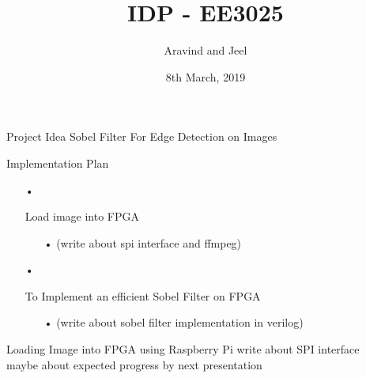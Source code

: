 \documentclass[11pt]{beamer}
\author{Aravind and Jeel}
\title{IDP - EE3025}
\institute{IIT Hyderabad}
\date{8th March, 2019}
\begin{document}
\begin{frame}
\titlepage
\end{frame}

\begin{frame}{Project Idea}
	\textsf{Sobel Filter For Edge Detection on Images}
\end{frame}

\begin{frame}{Implementation Plan}
	\begin{itemize}
		\item[•] {Load image into FPGA
			\begin{itemize}
				\item[•] (write about spi interface and ffmpeg)
			\end{itemize}
		}
		\pause
		\item[•] { To Implement an efficient Sobel Filter on FPGA
			\begin{itemize}
				\item[•] (write about sobel filter implementation in verilog)
			\end{itemize}					
		}
	\end{itemize}

\end{frame}

\begin{frame}{Loading Image into FPGA using Raspberry Pi}
write about SPI interface \\
maybe about expected progress by next presentation
\end{frame}
\end{document}

